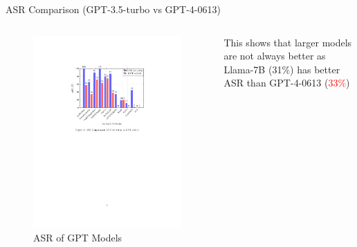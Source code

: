 \documentclass{beamer}
\begin{document}
\begin{frame}{ASR Comparison (GPT-3.5-turbo vs GPT-4-0613)}
    \begin{columns}
        \begin{figure}[ht]
            \centering
            \includegraphics[width=\linewidth]{pic/GPT_comparison.pdf}
            \caption{ASR of GPT Models}
            \label{fig:asr_plot_gpt}
        \end{figure}
        \pause
            This shows that larger models are not always better as Llama-7B (\textcolor{myGreenTextColor}{31\%}) has better ASR than GPT-4-0613 (\textcolor{red}{33\%})
    \end{columns}
\end{frame}
\end{document}
